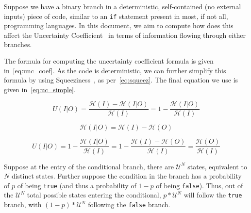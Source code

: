 \documentclass[a4paper]{article}
\newcommand{\entropy}[1]{\mathcal{H}(#1)}
\begin{document}
Suppose we have a binary branch in a deterministic, self-contained (no external
inputs) piece of code, similar to an \texttt{if} statement present in most, if
not all, programming languages. In this document, we aim to compute how does
this affect the Uncertainty Coefficient~\cite{press2007numerical} in terms of
information flowing through either branches.

The formula for computing the uncertainty coefficient formula is given
in~\autoref{eq:unc_coef}. As the code is deterministic, we can further simplify
this formula by using Squeeziness~\cite{clark2012squeeziness}, as
per~\autoref{eq:squeez}. The final equation we use is given
in~\autoref{eq:uc_simple}.

\begin{equation}\label{eq:unc_coef}
    U(I|O) = \frac{\entropy{I} - \entropy{I|O}}{\entropy{I}} = 1 - \frac{\entropy{I|O}}{\entropy{I}}
\end{equation}

\begin{equation}\label{eq:squeez}
    \entropy{I|O} = \entropy{I} - \entropy{O}
\end{equation}

\begin{equation}\label{eq:uc_simple}
    U(I|O) = 1 - \frac{\entropy{I|O}}{\entropy{I}} = 1 - \frac{\entropy{I} - \entropy{O}}{\entropy{I}} = \frac{\entropy{O}}{\entropy{I}}
\end{equation}

Suppose at the entry of the conditional branch, there are \(\mathcal{U}^N\)
states, equivalent to \(N\) distinct states. Further suppose the condition in
the branch has a probability of \(p\) of being \texttt{true} (and thus a
probability of \(1-p\) of being \texttt{false}). Thus, out of the
\(\mathcal{U}^N\) total possible states entering the conditional,
\(p*\mathcal{U}^N\) will follow the \texttt{true} branch, with \((1-p) *
\mathcal{U}^N\) following the \texttt{false} branch.



\end{document}
